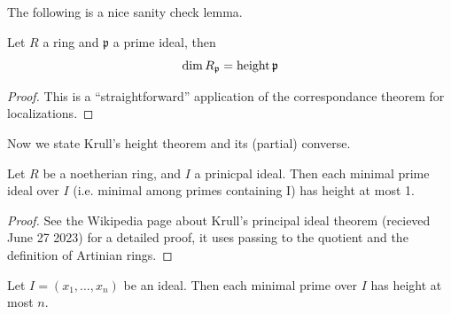 The following is a nice sanity check lemma.
    
\begin{lemma}
    \label{lem:dim_local_eq_height_prime}
    Let \(R\) a ring and \(\mathfrak{p}\) a
    prime ideal, then
    \[
    \dim R_{\mathfrak{p}} = \operatorname{height} \mathfrak{p}
    \]
\end{lemma}
    
\begin{proof}
    This is a ``straightforward'' application of the
    correspondance theorem for localizations.
\end{proof}
    

Now we state Krull's height theorem and its (partial) converse.



\begin{theorem}
    \label{thm:krull_principal_ideal}
    Let \(R\) be a noetherian ring, 
    and \(I\) a prinicpal ideal.
    Then each minimal prime ideal over \(I\) 
    (i.e. minimal among primes containing I)
    has height at most 1.
\end{theorem}

\begin{proof}
    See the Wikipedia page about Krull's principal ideal theorem
    (recieved June 27 2023) for a detailed proof,
    it uses passing to the quotient and the definition of
    Artinian rings.
\end{proof}

\begin{theorem}
    \label{thm:krull_height}
    Let \(I = (x_{1}, \ldots, x_{n})\) be an ideal. 
    Then each minimal prime over \(I\) has height
    at most \(n\).
\end{theorem}

